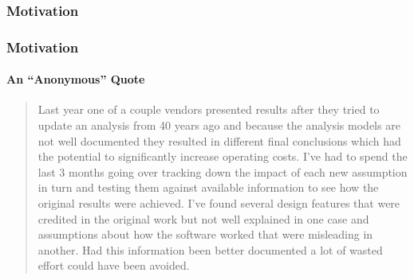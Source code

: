 \documentclass{beamer}
\begin{document}

\begin{frame}[label=motivation]

\frametitle{Motivation}
\begin{center}
\end{center}

\end{frame}


\begin{frame}[fragile]

\frametitle{Motivation} %
\framesubtitle{An ``Anonymous'' Quote}
{\fontsize{8}{10}
\begin{quotation}
Last year one of a couple vendors presented results after they tried to update an analysis from 40 years ago and because the analysis models are not well documented they resulted in different final conclusions which had the potential to significantly increase operating costs.   I've had to spend the last 3 months going over tracking down the impact of each new assumption in turn and testing them against available information to see how the original results were achieved.  I've found several design features that were credited in the original work but not well explained in one case and assumptions about how the software worked that were misleading in another.  Had this information been better documented a lot of wasted effort could have been avoided.
\end{quotation}}
\end{frame}
\end{document}
